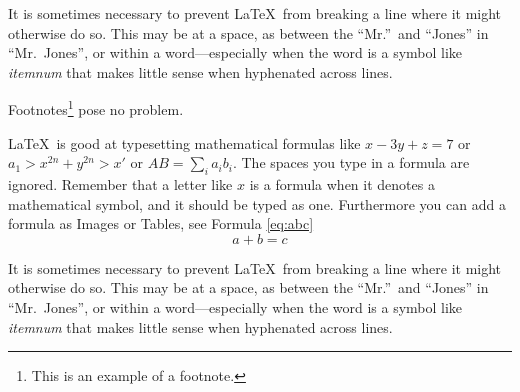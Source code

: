 It is sometimes necessary to prevent \LaTeX\ from
breaking a line where it might otherwise do so.
This may be at a space, as between the ``Mr.''\ and
``Jones'' in
``Mr.~Jones'',        %
or within a word---especially when the word is a
symbol like
\mbox{\emph{itemnum}} 
that makes little sense when hyphenated across
lines.

Footnotes\footnote{This is an example of a footnote.}
pose no problem.

\LaTeX\ is good at typesetting mathematical formulas
like
\( x-3y + z = 7 \) 
or
\( a_{1} > x^{2n} + y^{2n} > x' \)
or  
\( AB  = \sum_{i} a_{i} b_{i} \).
The spaces you type in a formula are 
ignored.  Remember that a letter like
$x$                   %
is a formula when it denotes a mathematical
symbol, and it should be typed as one.
Furthermore you can add a formula as Images or Tables, see Formula  \hyperref[eq:abc]{\ref{eq:abc}}
\begin{equation}
	\label{eq:abc}
	a+b=c
\end{equation}

It is sometimes necessary to prevent \LaTeX\ from
breaking a line where it might otherwise do so.
This may be at a space, as between the ``Mr.''\ and
``Jones'' in
``Mr.~Jones'',        %
or within a word---especially when the word is a
symbol like
\mbox{\emph{itemnum}} 
that makes little sense when hyphenated across
lines.